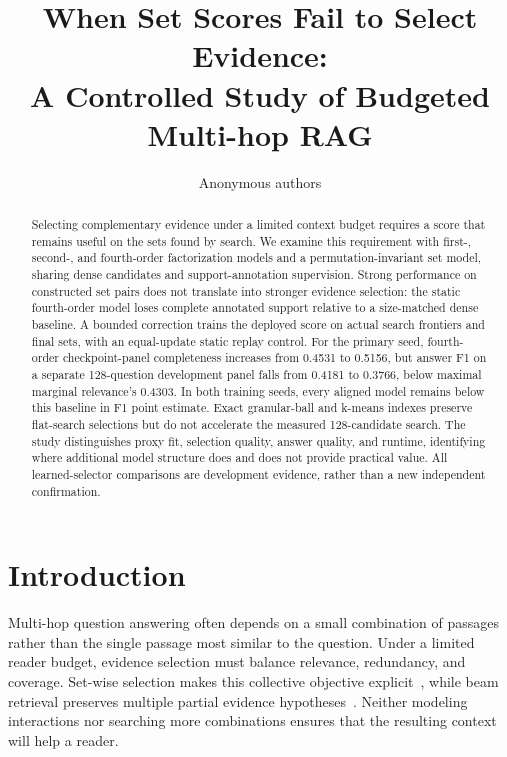 \documentclass[runningheads]{llncs}
\begin{document}
\title{When Set Scores Fail to Select Evidence:\\A Controlled Study of Budgeted Multi-hop RAG}
\author{Anonymous authors}
\maketitle
\begin{abstract}
Selecting complementary evidence under a limited context budget requires a
score that remains useful on the sets found by search. We examine this
requirement with first-, second-, and fourth-order factorization models and
a permutation-invariant set model, sharing dense candidates and
support-annotation supervision. Strong performance on constructed set pairs
does not translate into stronger evidence selection: the static fourth-order
model loses complete annotated support relative to a size-matched dense
baseline. A bounded correction trains the deployed score on actual search
frontiers and final sets, with an equal-update static replay control.
For the primary seed, fourth-order checkpoint-panel completeness increases
from 0.4531 to 0.5156, but answer F1 on a separate 128-question development
panel falls from 0.4181 to 0.3766, below maximal marginal relevance's 0.4303.
In both training seeds, every aligned model remains below this baseline
in F1 point estimate.
Exact granular-ball and k-means indexes preserve flat-search
selections but do not accelerate the measured 128-candidate search.
The study distinguishes proxy fit, selection quality, answer quality, and
runtime, identifying where additional model structure does and does not
provide practical value. All learned-selector comparisons are development
evidence, rather than a new independent confirmation.
\end{abstract}

\section{Introduction}
Multi-hop question answering often depends on a small combination of
passages rather than the single passage most similar to the question.
Under a limited reader budget, evidence selection must balance relevance,
redundancy, and coverage. Set-wise selection makes this collective objective
explicit~\cite{lee2025setr}, while beam retrieval preserves multiple partial
evidence hypotheses~\cite{zhang2024beam}. Neither modeling interactions nor
searching more combinations ensures that the resulting context will help a
reader.
\end{document}
